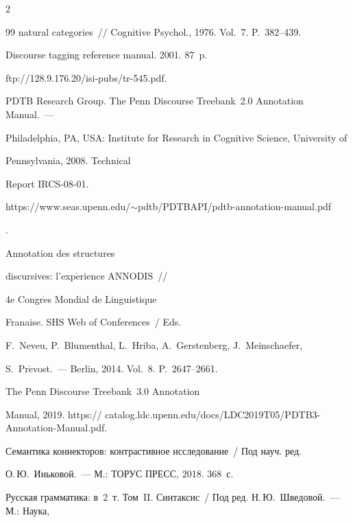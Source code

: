 \begin{multicols}{2}
{{\begin{thebibliography}{99}
natural categories~// Cognitive Psychol., 1976. Vol.~7. P.~382--439.




 Discourse tagging reference manual. 2001.  87~p. 


{\sf  ftp://128.9.176.20/isi-pubs/tr-545.pdf}. 







PDTB Research Group. The Penn Discourse Treebank~2.0 Annotation Manual.~--- 


Philadelphia, PA, USA: Institute for Research in Cognitive Science, University of 


Pennsylvania, 2008. Technical 


Report IRCS-08-01. {\sf  


https://www.seas.upenn.edu/$\sim$pdtb/PDTBAPI/pdtb-annotation-manual.pdf}.







 Annotation des structures 


discursives: l'exp$\acute{\mbox{e}}$rience ANNODIS~// 


4e Congr$\grave{\mbox{e}}$s Mondial de Linguistique 


\mbox{Fran{\normalsize\!}aise}. SHS Web of Conferences~/ Eds.


F.~Neveu, P.~Blumenthal, L.~Hriba, A.~Gerstenberg, J.~Meinschaefer, 


S.~Pr$\acute{\mbox{e}}$vost.~--- Berlin, 2014. Vol.~8. P.~2647--2661.







 The Penn Discourse Treebank~3.0 Annotation 


Manual, 2019. {\sf https:// catalog.ldc.upenn.edu/docs/LDC2019T05/PDTB3-Annotation-Manual.pdf}.




Семантика коннекторов: контрастивное исследование~/ Под науч. ред.


О.\,Ю.~Иньковой.~---  М.: ТОРУС ПРЕСС, 2018. 368~с.




Русская грамматика: в~2~т. Том~II. Синтаксис~/ Под ред. Н.\,Ю.~Шведовой.~--- М.: Наука, 



\end{thebibliography}}}
\end{multicols}
